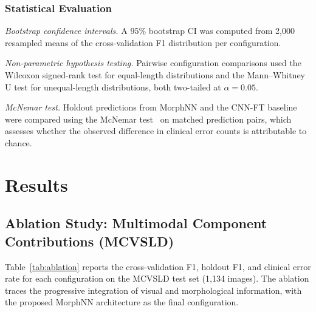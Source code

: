 \documentclass[preprint,12pt]{elsarticle}
\begin{document}
\subsubsection{Statistical Evaluation}

\textit{Bootstrap confidence intervals.}
A 95\% bootstrap CI was computed from 2,000 resampled means of the
cross-validation F1 distribution per configuration.

\textit{Non-parametric hypothesis testing.}
Pairwise configuration comparisons used the Wilcoxon signed-rank test
for equal-length distributions and the Mann--Whitney U test for
unequal-length distributions, both two-tailed at $\alpha = 0.05$.

\textit{McNemar test.}
Holdout predictions from MorphNN and the CNN-FT baseline were compared
using the McNemar test~\cite{mcnemar1947} on matched prediction pairs,
which assesses whether the observed difference in clinical error counts
is attributable to chance.


\section{Results}
\label{sec:results}

\subsection{Ablation Study: Multimodal Component Contributions (MCVSLD)}
\label{sec:ablation}

Table~\ref{tab:ablation} reports the cross-validation F1, holdout F1,
and clinical error rate for each configuration on the MCVSLD test set
(1,134 images).  The ablation traces the progressive integration of
visual and morphological information, with the proposed MorphNN
architecture as the final configuration.
\end{document}
